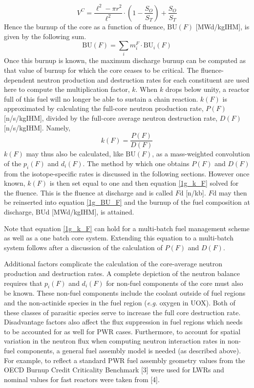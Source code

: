 \begin{equation}
\label{1g_VC}
V^C = \frac{\ell^2 - \pi r^2}{\ell^2} \cdot \left(1 - \frac{S_O}{S_T}\right) + \frac{S_O}{S_T}
\end{equation}
Hence the burnup of the core as a function of fluence, $\mbox{BU}(F)$ [MWd/kgIHM], is given by 
the following sum.
\begin{equation}
\label{1g_BU_F}
\mbox{BU}(F) = \sum_i m_i^F \cdot \mbox{BU}_i(F)
\end{equation}
Once this burnup is known, the maximum discharge burnup can be computed as that value of burnup 
for which the core ceases to be critical.  The fluence-dependent neutron production and destruction 
rates for each constituent are used here to compute the multiplication factor, $k$.    When $k$ drops 
below unity, a reactor full of this fuel will no longer be able to sustain a chain reaction.  $k(F)$ is 
approximated by calculating the full-core neutron production rate, $P(F)$ [n/s/kgIHM], divided by the 
full-core average neutron destruction rate, $D(F)$ [n/s/kgIHM].  Namely,
\begin{equation}
\label{1g_k_F}
k(F) = \frac{P(F)}{D(F)}
\end{equation}
$k(F)$ may thus also be calculated, like $\mbox{BU}(F)$, as a mass-weighted convolution of the $p_i(F)$ and 
$d_i(F)$.  The method by which one obtains $P(F)$ and $D(F)$ from the isotope-specific rates is discussed 
in the following sections.  However once known, $k(F)$ is then set equal to one and then equation \ref{1g_k_F} 
solved for the fluence.  This is the fluence at discharge and is called $F\mbox{d}$ [n/kb].  $F\mbox{d}$ may then 
be reinserted into equation \ref{1g_BU_F} and the burnup of the fuel composition at discharge, 
BUd [MWd/kgIHM], is attained.

Note that equation \ref{1g_k_F} can hold for a multi-batch fuel management scheme as well as a one batch core 
system.  Extending this equation to a multi-batch system follows after a discussion of the calculation of 
$P(F)$ and $D(F)$.

Additional factors complicate the calculation of the core-average neutron production and destruction rates.  
A complete depiction of the neutron balance requires that $p_i(F)$ and $d_i(F)$ for non-fuel components of 
the core must also be known.  These non-fuel components include the coolant outside of fuel regions and the 
non-actinide species in the fuel region (\emph{e.g.} oxygen in UOX).  Both of these classes of parasitic 
species serve to increase the full core destruction rate.  Disadvantage factors also affect the flux 
suppression in fuel regions which needs to be accounted for as well for PWR cases.  Furthermore, to 
account for spatial variation in the neutron flux when computing neutron interaction rates in non-fuel 
components, a general fuel assembly model is needed (as described above).  For example, to reflect a 
standard PWR fuel assembly geometry values from the OECD Burnup Credit Criticality Benchmark [3] 
were used for LWRs and nominal values for fast reactors were taken from [4].  

